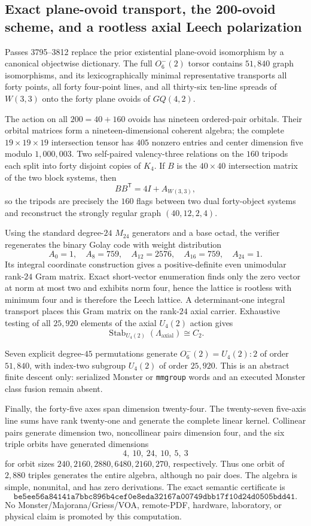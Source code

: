 \subsection{Exact plane-ovoid transport, the 200-ovoid scheme, and a rootless axial Leech polarization}
\label{sec:bt3795-3812-plane-ovoid-leech-axial}

Passes 3795--3812 replace the prior existential plane-ovoid isomorphism by a canonical objectwise dictionary.  The full $O^-_6(2)$ torsor contains $51{,}840$ graph isomorphisms, and its lexicographically minimal representative transports all forty points, all forty four-point lines, and all thirty-six ten-line spreads of $W(3,3)$ onto the forty plane ovoids of $GQ(4,2)$.

The action on all $200=40+160$ ovoids has nineteen ordered-pair orbitals.  Their orbital matrices form a nineteen-dimensional coherent algebra; the complete $19\times19\times19$ intersection tensor has $405$ nonzero entries and center dimension five modulo $1{,}000{,}003$.  Two self-paired valency-three relations on the $160$ tripods each split into forty disjoint copies of $K_4$.  If $B$ is the $40\times40$ intersection matrix of the two block systems, then
\[
 B B^{\mathsf T}=4I+A_{W(3,3)},
\]
so the tripods are precisely the $160$ flags between two dual forty-object systems and reconstruct the strongly regular graph $(40,12,2,4)$.

Using the standard degree-$24$ $M_{24}$ generators and a base octad, the verifier regenerates the binary Golay code with weight distribution
\[
 A_0=1,\quad A_8=759,\quad A_{12}=2576,\quad A_{16}=759,\quad A_{24}=1.
\]
Its integral coordinate construction gives a positive-definite even unimodular rank-$24$ Gram matrix.  Exact short-vector enumeration finds only the zero vector at norm at most two and exhibits norm four, hence the lattice is rootless with minimum four and is therefore the Leech lattice.  A determinant-one integral transport places this Gram matrix on the rank-$24$ axial carrier.  Exhaustive testing of all $25{,}920$ elements of the axial $U_4(2)$ action gives
\[
 \operatorname{Stab}_{U_4(2)}(\Lambda_{\mathrm{axial}})\cong C_2.
\]

Seven explicit degree-$45$ permutations generate $O^-_6(2)=U_4(2){:}2$ of order $51{,}840$, with index-two subgroup $U_4(2)$ of order $25{,}920$.  This is an abstract finite descent only: serialized Monster or \texttt{mmgroup} words and an executed Monster class fusion remain absent.

Finally, the forty-five axes span dimension twenty-four.  The twenty-seven five-axis line sums have rank twenty-one and generate the complete linear kernel.  Collinear pairs generate dimension two, noncollinear pairs dimension four, and the six triple orbits have generated dimensions
\[
4,\ 10,\ 24,\ 10,\ 5,\ 3
\]
for orbit sizes $240,2160,2880,6480,2160,270$, respectively.  Thus one orbit of $2{,}880$ triples generates the entire algebra, although no pair does.  The algebra is simple, nonunital, and has zero derivations.  The exact semantic certificate is
\[
\texttt{be5ee56a84141a7bbc896b4cef0e8eda32167a00749dbb17f10d24d0505bdd41}.
\]
No Monster/Majorana/Griess/VOA, remote-PDF, hardware, laboratory, or physical claim is promoted by this computation.

